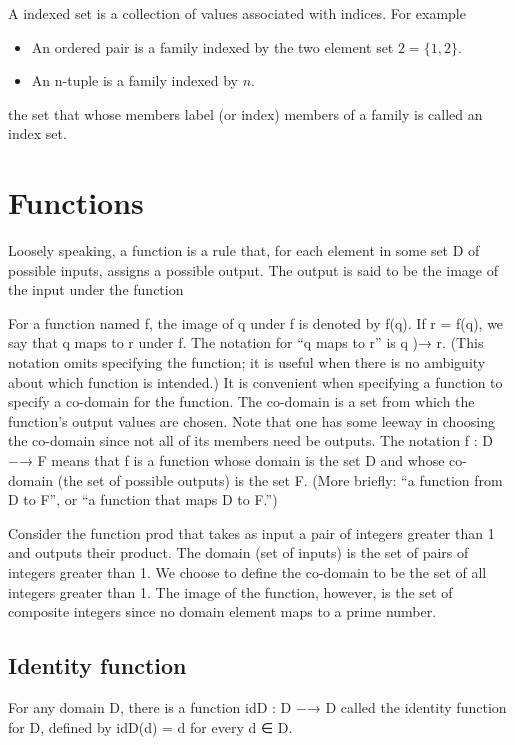 A indexed set is a collection of values associated with indices. For example
\begin{itemize}
\item An ordered pair is a family indexed by the two element set $2 = \{1, 2\}$.
\item An n-tuple is a family indexed by $n$.
\end{itemize}
the set that whose members label (or index) members of a family is called an index set. 

\section{Functions}
Loosely speaking, a function is a rule that, for each element in some set D of possible inputs,  assigns a possible output. The output is said to be the image of the input under the function 

For a function named f, the image of q under f is denoted by f(q). If r = f(q), we say that  q maps to r under f. The notation for “q maps to r” is q )→ r. (This notation omits specifying  the function; it is useful when there is no ambiguity about which function is intended.)  It is convenient when specifying a function to specify a co-domain for the function. The  co-domain is a set from which the function’s output values are chosen. Note that one has some  leeway in choosing the co-domain since not all of its members need be outputs.  The notation  f : D −→ F  means that f is a function whose domain is the set D and whose co-domain (the set of possible  outputs) is the set F. (More briefly: “a function from D to F”, or “a function that maps D to F.”) 

Consider the function prod that takes as input a pair of integers greater than  1 and outputs their product. The domain (set of inputs) is the set of pairs of integers greater  than 1. We choose to define the co-domain to be the set of all integers greater than 1. The  image of the function, however, is the set of composite integers since no domain element maps  to a prime number. 

\subsection{Identity function} 
For any domain D, there is a function idD : D −→ D called the identity function for D, defined  by  idD(d) = d  for every d ∈ D. 

